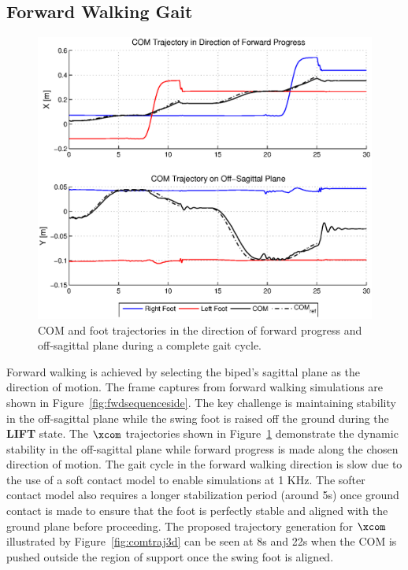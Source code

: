 \subsection{Forward Walking Gait} %
\label{sub:forward_walking_gait}

\begin{figure}[!b]
	\centering
    \includegraphics[scale=0.7]{fig/simulations/fwdcomtraj.eps}
  	\caption{COM and foot trajectories in the direction of forward progress and off-sagittal plane during a complete gait cycle.}
	\label{fig:fwdcomtraj}
\end{figure}

Forward walking is achieved by selecting the biped's sagittal plane as the direction of motion. The frame captures from forward walking simulations are shown in Figure~\ref{fig:fwdsequenceside}. The key challenge is maintaining stability in the off-sagittal plane while the swing foot is raised off the ground during the \textbf{LIFT} state. The $\xcom$ trajectories shown in Figure~\ref{fig:fwdcomtraj} demonstrate the dynamic stability in the off-sagittal plane while forward progress is made along the chosen direction of motion. The gait cycle in the forward walking direction is slow due to the use of a soft contact model to enable simulations at 1 KHz. The softer contact model also requires a longer stabilization period (around 5s) once ground contact is made to ensure that the foot is perfectly stable and aligned with the ground plane before proceeding. The proposed trajectory generation for $\xcom$ illustrated by Figure~\ref{fig:comtraj3d} can be seen at 8s and 22s when the COM is pushed outside the region of support once the swing foot is aligned. 


